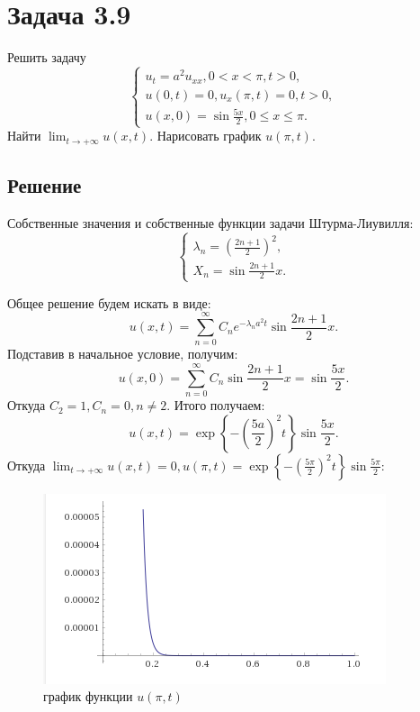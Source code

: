 \documentclass[11pt]{article}
\begin{document}
\section{Задача 3.9}
\label{sec:org2d8c219}
Решить задачу
\begin{equation}
\begin{cases}
u_t = a^2u_{xx}, 0 < x < \pi, t > 0, \\
u(0, t) = 0, u_x(\pi, t) = 0, t > 0, \\
u(x, 0) = \sin\frac{5x}2, 0 \leq x \leq \pi.
\end{cases}
\end{equation}
Найти $\lim_{t \to +\infty}u(x, t)$. Нарисовать график $u(\pi, t)$.
\subsection{Решение}
\label{sec:org4780527}
Собственные значения и собственные функции задачи Штурма-Лиувилля:
\begin{equation*}
\begin{cases}
\lambda_n = \left(\frac{2n + 1}2\right)^2, \\
X_n = \sin\frac{2n + 1}2x.
\end{cases}
\end{equation*}

Общее решение будем искать в виде:
\begin{equation*}
u(x, t) = \sum_{n = 0}^{\infty}C_ne^{-\lambda_na^2t}\sin\frac{2n + 1}2x.
\end{equation*}
Подставив в начальное условие, получим:
\begin{equation*}
u(x, 0) = \sum_{n = 0}^{\infty}C_n\sin\frac{2n + 1}2x = \sin\frac{5x}2.
\end{equation*}
Откуда $C_2 = 1, C_n = 0, n \neq 2$. Итого получаем:
\begin{equation}
u(x, t) = \exp\left\{-\left(\frac{5a}2\right)^2t\right\}\sin\frac{5x}2.
\end{equation}
Откуда $\lim_{t \to +\infty}u(x, t) = 0, u(\pi, t) = \exp\left\{-\left(\frac{5\pi}2\right)^2t\right\}\sin\frac{5\pi}2$:
\begin{figure}[htbp]
\centering
\includegraphics[width=.9\linewidth]{./img/image_2019-09-21_19-20-42.png}
\caption{график функции \(u(\pi, t)\)}
\end{figure}
\end{document}
